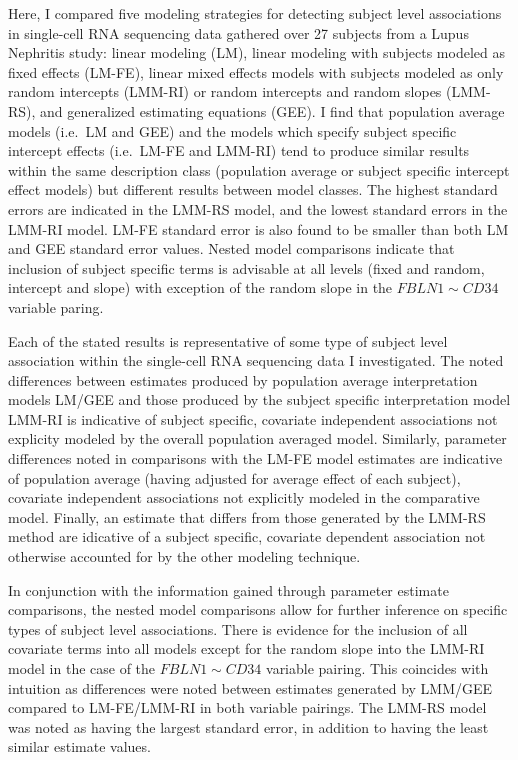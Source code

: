 \documentclass[12pt,]{article}
\begin{document}
Here, I compared five modeling strategies for detecting subject level
associations in single-cell RNA sequencing data gathered over 27
subjects from a Lupus Nephritis study: linear modeling (LM), linear
modeling with subjects modeled as fixed effects (LM-FE), linear mixed
effects models with subjects modeled as only random intercepts (LMM-RI)
or random intercepts and random slopes (LMM-RS), and generalized
estimating equations (GEE). I find that population average models
(i.e.~LM and GEE) and the models which specify subject specific
intercept effects (i.e.~LM-FE and LMM-RI) tend to produce similar
results within the same description class (population average or subject
specific intercept effect models) but different results between model
classes. The highest standard errors are indicated in the LMM-RS model,
and the lowest standard errors in the LMM-RI model. LM-FE standard error
is also found to be smaller than both LM and GEE standard error values.
Nested model comparisons indicate that inclusion of subject specific
terms is advisable at all levels (fixed and random, intercept and slope)
with exception of the random slope in the \(FBLN1 \sim CD34\) variable
paring.

Each of the stated results is representative of some type of subject
level association within the single-cell RNA sequencing data I
investigated. The noted differences between estimates produced by
population average interpretation models LM/GEE and those produced by
the subject specific interpretation model LMM-RI is indicative of
subject specific, covariate independent associations not explicity
modeled by the overall population averaged model. Similarly, parameter
differences noted in comparisons with the LM-FE model estimates are
indicative of population average (having adjusted for average effect of
each subject), covariate independent associations not explicitly modeled
in the comparative model. Finally, an estimate that differs from those
generated by the LMM-RS method are idicative of a subject specific,
covariate dependent association not otherwise accounted for by the other
modeling technique.

In conjunction with the information gained through parameter estimate
comparisons, the nested model comparisons allow for further inference on
specific types of subject level associations. There is evidence for the
inclusion of all covariate terms into all models except for the random
slope into the LMM-RI model in the case of the \(FBLN1 \sim CD34\)
variable pairing. This coincides with intuition as differences were
noted between estimates generated by LMM/GEE compared to LM-FE/LMM-RI in
both variable pairings. The LMM-RS model was noted as having the largest
standard error, in addition to having the least similar estimate values.
\end{document}
